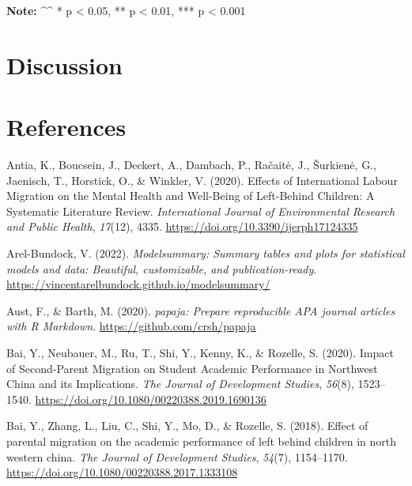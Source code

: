 \documentclass[
  man]{apa7}
\newlength{\cslhangindent}
\newlength{\cslentryspacingunit} %
\newenvironment{CSLReferences}[2] %
 {%
  \setlength{\parindent}{0pt}
  \ifodd #1
  \let\oldpar\par
  \def\par{\hangindent=\cslhangindent\oldpar}
  \fi
  \setlength{\parskip}{#2\cslentryspacingunit}
 }%
 {}
\begin{document}
\textbf{Note:}
\^{}\^{} * p \textless{} 0.05, ** p \textless{} 0.01, *** p \textless{} 0.001

\hypertarget{discussion}{%
\section{Discussion}\label{discussion}}

\newpage

\hypertarget{references}{%
\section{References}\label{references}}

\hypertarget{refs}{}
\begin{CSLReferences}{1}{0}
\leavevmode{}%
Antia, K., Boucsein, J., Deckert, A., Dambach, P., Račaitė, J., Šurkienė, G., Jaenisch, T., Horstick, O., \& Winkler, V. (2020). Effects of International Labour Migration on the Mental Health and Well-Being of Left-Behind Children: A Systematic Literature Review. \emph{International Journal of Environmental Research and Public Health}, \emph{17}(12), 4335. \url{https://doi.org/10.3390/ijerph17124335}

\leavevmode{}%
Arel-Bundock, V. (2022). \emph{Modelsummary: Summary tables and plots for statistical models and data: Beautiful, customizable, and publication-ready}. \url{https://vincentarelbundock.github.io/modelsummary/}

\leavevmode{}%
Aust, F., \& Barth, M. (2020). \emph{{papaja}: {Prepare} reproducible {APA} journal articles with {R Markdown}}. \url{https://github.com/crsh/papaja}

\leavevmode{}%
Bai, Y., Neubauer, M., Ru, T., Shi, Y., Kenny, K., \& Rozelle, S. (2020). Impact of Second-Parent Migration on Student Academic Performance in Northwest China and its Implications. \emph{The Journal of Development Studies}, \emph{56}(8), 1523--1540. \url{https://doi.org/10.1080/00220388.2019.1690136}

\leavevmode{}%
Bai, Y., Zhang, L., Liu, C., Shi, Y., Mo, D., \& Rozelle, S. (2018). Effect of parental migration on the academic performance of left behind children in north western china. \emph{The Journal of Development Studies}, \emph{54}(7), 1154--1170. \url{https://doi.org/10.1080/00220388.2017.1333108}


\end{CSLReferences}
\end{document}

